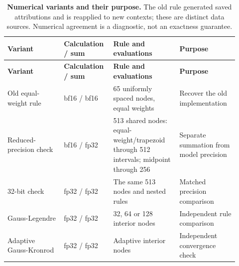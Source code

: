 \setlength{\tabcolsep}{2pt}
\begin{longtable}{p{0.230\linewidth} p{0.180\linewidth} p{0.270\linewidth} p{0.240\linewidth}}
\caption{\textbf{Numerical variants and their purpose.} The old rule generated saved attributions and is reapplied to new contexts; these are distinct data sources. Numerical agreement is a diagnostic, not an exactness guarantee.}\label{tab:r1-estimators}\\
\toprule
\textbf{Variant} & \textbf{Calculation / sum} & \textbf{Rule and evaluations} & \textbf{Purpose} \\
\midrule\endfirsthead
\toprule
\textbf{Variant} & \textbf{Calculation / sum} & \textbf{Rule and evaluations} & \textbf{Purpose} \\
\midrule\endhead
\bottomrule\endfoot
Old equal-weight rule & bf16 / bf16 & 65 uniformly spaced nodes, equal weights & Recover the old implementation \\
Reduced-precision check & bf16 / fp32 & 513 shared nodes: equal-weight/trapezoid through 512 intervals; midpoint through 256 & Separate summation from model precision \\
32-bit check & fp32 / fp32 & The same 513 nodes and nested rules & Matched precision comparison \\
Gauss-Legendre & fp32 / fp32 & 32, 64 or 128 interior nodes & Independent rule comparison \\
Adaptive Gauss-Kronrod & fp32 / fp32 & Adaptive interior nodes & Independent convergence check \\
\end{longtable}
